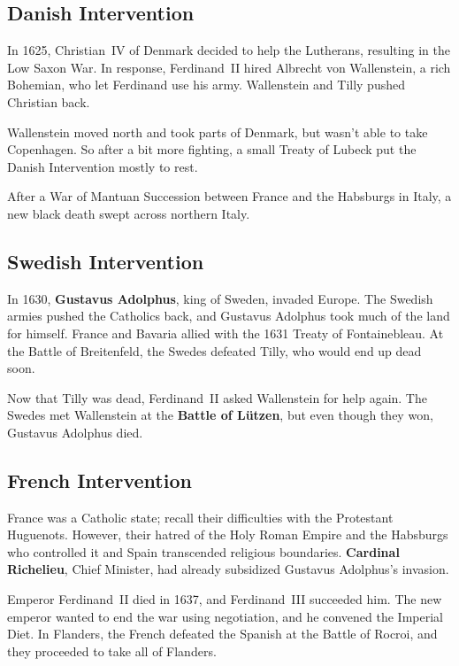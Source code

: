 \subsection*{Danish Intervention}

In 1625, Christian~IV of Denmark decided to help the Lutherans, resulting in the Low Saxon War.
In response, Ferdinand~II hired Albrecht von Wallenstein, a rich Bohemian,
who let Ferdinand use his army.
Wallenstein and Tilly pushed Christian back.

Wallenstein moved north and took parts of Denmark, but wasn't able to take Copenhagen.
So after a bit more fighting, a small Treaty of Lubeck put the Danish Intervention mostly to rest.

After a War of Mantuan Succession between France and the Habsburgs in Italy,
a new black death swept across northern Italy.

\subsection*{Swedish Intervention}

In 1630, \textbf{Gustavus Adolphus}, king of Sweden, invaded Europe.
The Swedish armies pushed the Catholics back, and Gustavus Adolphus took much of the land for himself.
France and Bavaria allied with the 1631 Treaty of Fontainebleau.
At the Battle of Breitenfeld, the Swedes defeated Tilly, who would end up dead soon.

Now that Tilly was dead, Ferdinand~II asked Wallenstein for help again.
The Swedes met Wallenstein at the \textbf{Battle of L\"utzen},
but even though they won, Gustavus Adolphus died.

\subsection*{French Intervention}

France was a Catholic state; recall their difficulties with the Protestant Huguenots.
However, their hatred of the Holy Roman Empire and the Habsburgs who controlled it and Spain
transcended religious boundaries.
\textbf{Cardinal Richelieu}, Chief Minister, had already subsidized Gustavus Adolphus's invasion.

Emperor Ferdinand~II died in 1637, and Ferdinand~III succeeded him.
The new emperor wanted to end the war using negotiation, and he convened the Imperial Diet.
In Flanders, the French defeated the Spanish at the Battle of Rocroi,
and they proceeded to take all of Flanders.

